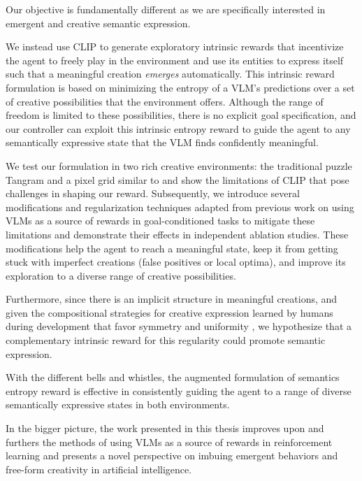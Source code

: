 Our objective is fundamentally different as we are specifically interested in emergent and creative semantic expression.

We instead use CLIP to generate exploratory intrinsic rewards that incentivize the agent to freely play in the environment and use its entities to express itself such that a meaningful creation \emph{emerges} automatically.
This intrinsic reward formulation is based on minimizing the entropy of a VLM's predictions over a set of creative possibilities that the environment offers.
Although the range of freedom is limited to these possibilities, there is no explicit goal specification,
and our controller can exploit this intrinsic entropy reward to guide the agent to any semantically expressive state that the VLM finds confidently meaningful.

We test our formulation in two rich creative environments: the traditional puzzle Tangram and a pixel grid similar to  and show the limitations of CLIP that pose challenges in shaping our reward.
Subsequently, we introduce several modifications and regularization techniques adapted from previous work on using VLMs as a source of rewards in goal-conditioned tasks \citep{zest,negprompt,vlmrm} to mitigate these limitations and demonstrate their effects in independent ablation studies.
These modifications help the agent to reach a meaningful state, keep it from getting stuck with imperfect creations (false positives or local optima), and improve its exploration to a diverse range of creative possibilities.


Furthermore, since there is an implicit structure in meaningful creations, and given the compositional strategies for creative expression learned by humans during development that favor symmetry \citep{symmetry} and uniformity \citep{compositional}, we hypothesize that a complementary intrinsic reward for this regularity \citep{rair} could promote semantic expression.

With the different bells and whistles, the augmented formulation of semantics entropy reward is effective in consistently guiding the agent to a range of diverse semantically expressive states in both environments.


In the bigger picture, the work presented in this thesis improves upon and furthers the methods of using VLMs as a source of rewards in reinforcement learning and presents a novel perspective on imbuing emergent behaviors and free-form creativity in artificial intelligence.
